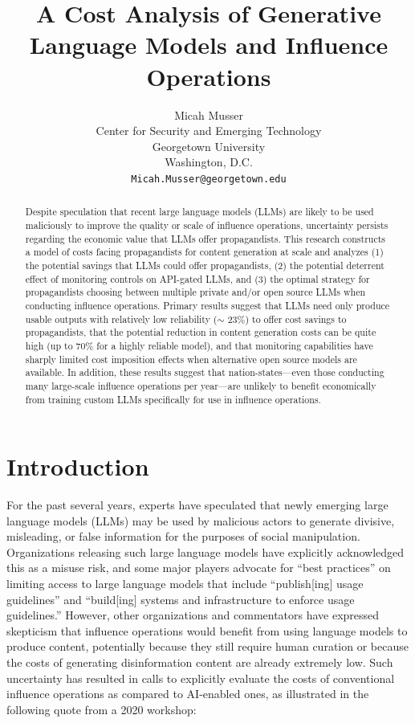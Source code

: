 \documentclass{article}
\title{A Cost Analysis of Generative Language Models and Influence Operations}
\author{
  Micah Musser \\
  Center for Security and Emerging Technology \\
  Georgetown University \\
  Washington, D.C. \\
  \texttt{Micah.Musser@georgetown.edu} \\
}
\begin{document}
\maketitle


\begin{abstract}
Despite speculation that recent large language models (LLMs) are likely to be used maliciously to improve the quality or scale of influence operations, uncertainty persists regarding the economic value that LLMs offer propagandists. This research constructs a model of costs facing propagandists for content generation at scale and analyzes (1) the potential savings that LLMs could offer propagandists, (2) the potential deterrent effect of monitoring controls on API-gated LLMs, and (3) the optimal strategy for propagandists choosing between multiple private and/or open source LLMs when conducting influence operations. Primary results suggest that LLMs need only produce usable outputs with relatively low reliability ($\sim$ 23\%) to offer cost savings to propagandists, that the potential reduction in content generation costs can be quite high (up to 70\% for a highly reliable model), and that monitoring capabilities have sharply limited cost imposition effects when alternative open source models are available. In addition, these results suggest that nation-states—even those conducting many large-scale influence operations per year—are unlikely to benefit economically from training custom LLMs specifically for use in influence operations.
\end{abstract}




\section{Introduction} 

For the past several years, experts have speculated that newly emerging large language models (LLMs) may be used by malicious actors to generate divisive, misleading, or false information for the purposes of social manipulation. \cite{CRESTreport, propasservice, CSETreport, workshop, kreps, middlebury, withsecure, sedova2} Organizations releasing such large language models have explicitly acknowledged this as a misuse risk, \cite{radford, deepmind} and some major players advocate for ``best practices'' on limiting access to large language models that include ``publish[ing] usage guidelines'' and ``build[ing] systems and infrastructure to enforce usage guidelines.'' \cite{cohere} However, other organizations and commentators have expressed skepticism that influence operations would benefit from using language models to produce content, potentially because they still require human curation or because the costs of generating disinformation content are already extremely low. \cite{gpt3, lazar, eleuther, snakeoil, releasestrats} Such uncertainty has resulted in calls to explicitly evaluate the costs of conventional influence operations as compared to AI-enabled ones, as illustrated in the following quote from a 2020 workshop:
\end{document}
